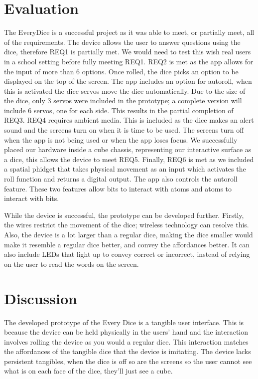 \documentclass{sigchi}
\begin{document}



\section{Evaluation}

 The EveryDice is a successful project as it was able to meet, or partially meet, all of the requirements. The device allows the user to answer questions using the dice, therefore REQ1 is partially met. We would need to test this wish real users in a school setting before fully meeting REQ1. REQ2 is met as the app allows for the input of more than 6 options. Once rolled, the dice picks an option to be displayed on the top of the screen. The app includes an option for autoroll, when this is activated the dice servos move the dice automatically. Due to the size of the dice, only 3 servos were included in the prototype; a complete version will include 6 servos, one for each side. This results in the partial completion of REQ3. REQ4 requires ambient media. This is included as the dice makes an alert sound and the screens turn on when it is time to be used. The screens turn off when the app is not being used or when the app loses focus. We successfully placed our hardware inside a cube chassis, representing our interactive surface as a dice, this allows the device to meet REQ5. Finally, REQ6 is met as we included a spatial phidget that takes physical movement as an input which activates the roll function and returns a digital output. The app also controls the autoroll feature. These two features allow bits to interact with atoms and atoms to interact with bits. 

While the device is successful, the prototype can be developed further. Firstly, the wires restrict the movement of the dice; wireless technology can resolve this. Also, the device is a lot larger than a regular dice, making the dice smaller would make it resemble a regular dice better, and convey the affordances better. It can also include LEDs that light up to convey correct or incorrect, instead of relying on the user to read the words on the screen. 

\section{Discussion}

The developed prototype of the Every Dice is a tangible user interface. This is because the device can be held physically in the users’ hand and the interaction involves rolling the device as you would a regular dice. This interaction matches the affordances of the tangible dice that the device is imitating. The device lacks persistent tangibles, when the dice is off so are the screens so the user cannot see what is on each face of the dice, they’ll just see a cube. 
\end{document}
